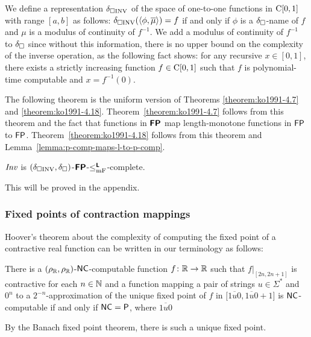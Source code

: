 \documentclass[envcountsame,orivec,oribibl]{llncs}
\begin{document}
We define a representation $\delta _{\square \mathrm{INV}}$ of the space of 
one-to-one functions in $\mathrm C[0,1]$ 
with range $[a, b]$ as follows:
$\delta _{\square \mathrm{INV}}(\langle \phi, \overline{\mu} \rangle) = f$ 
if and only if $\phi$ is a $\delta _\square$-name of $f$ 
and $\mu$ is a modulus of continuity of $f^{-1}$.
We add a modulus of continuity of $f^{-1}$ to $\delta _\square$
since without this information, there is no upper bound on 
the complexity of the inverse operation, 
as the following fact \cite[Theorem 4.4]{ko1991complexity} shows: 
for any recursive $x \in [0, 1]$, 
there exists a strictly increasing function $f \in \mathrm C[0, 1]$ 
such that $f$ is polynomial-time computable and $x = f^{-1}(0)$.

The following theorem is the uniform version of Theorems 
\ref{theorem:ko1991-4.7} and 
\ref{theorem:ko1991-4.18}.
Theorem~\ref{theorem:ko1991-4.7} follows from this theorem and the fact that
functions in $\text{\bfseries \sffamily \upshape FP}$ map length-monotone functions in $\mathsf{FP}$ to $\mathsf{FP}$.
Theorem~\ref{theorem:ko1991-4.18} follows from this theorem and Lemma~\ref{lemma:p-comp-maps-l-to-p-comp}.

\begin{theorem}
 \label{theorem:INV-is-P-complete}
 $\mathit{Inv}$ is $(\delta _{\square \mathrm{INV}}, \delta _\square)$-$\text{\bfseries \sffamily \upshape FP}$-$\leq _{\mathrm{mF}} ^{\text{\bfseries \sffamily \upshape L}}$-complete.
\end{theorem}

This will be proved in the appendix. 

\subsubsection{Fixed points of contraction mappings}

Hoover's theorem about the complexity of computing the fixed point
of a contractive real function
can be written in our terminology as follows:

\begin{theorem}
\label{theorem:hoover1991-4.5}
 There is a $(\rho _\mathbb R, \rho _\mathbb R)$-$\mathsf{NC}$-computable function $f \colon \mathbb R \to \mathbb R$
 such that $f|_{[2n, 2n+1]}$ is contractive for each $n \in \mathbb N$ and
 a function mapping a pair of strings $u \in \Sigma^*$ and $0^n$
 to a $2^{-n}$-approximation of the unique fixed point of $f$
 in $\bigl[ \overline{1u0}, \overline{1u0}+1 \bigr]$ is $\mathsf{NC}$-computable
 if and only if $\mathsf{NC} = \mathsf{P}$, 
 where $\overline{1u0}$
\end{theorem}

By the Banach fixed point theorem, 
there is such a unique fixed point. 
\end{document}
